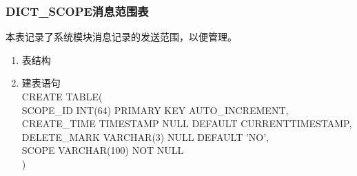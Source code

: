 \subsubsection{DICT\_SCOPE消息范围表}
本表记录了系统模块消息记录的发送范围，以便管理。
\begin{enumerate}
    \item 表结构
    \begin{table}[htbp]
        \centering
        \end{table}
    \item 建表语句\\
        CREATE TABLE(\\
            SCOPE\_ID INT(64) PRIMARY KEY AUTO\_INCREMENT,\\
            CREATE\_TIME TIMESTAMP NULL DEFAULT CURRENTTIMESTAMP,\\
            DELETE\_MARK VARCHAR(3) NULL DEFAULT 'NO',\\
            SCOPE VARCHAR(100) NOT NULL\\
        )
    \end{enumerate}

